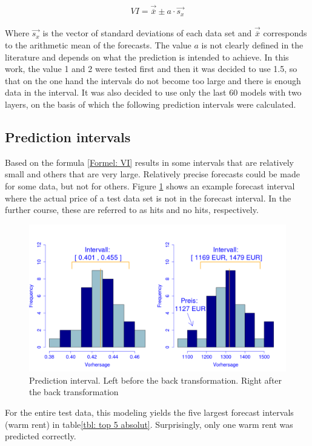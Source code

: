 \begin{align}\label{Formel: VI}
	VI=\vec{\overline{x}} \pm a \cdot \vec{s_x}
\end{align} 

	Where $\vec{s_x}$ is the vector of standard deviations of each data set and $\vec{\overline{x}}$ corresponds to the arithmetic mean of the forecasts. The value $a$ is not clearly defined in the literature and depends on what the prediction is intended to achieve. In this work, the value 1 and 2 were tested first and then it was decided to use 1.5, so that on the one hand the intervals do not become too large and there is enough data in the interval. It was also decided to use only the last 60 models with two layers, on the basis of which the following prediction intervals were calculated.

\subsection{Prediction intervals}

	Based on the formula \ref{Formel: VI} results in some intervals that are relatively small and others that are very large. Relatively precise forecasts could be made for some data, but not for others. Figure \ref{fig: HIST VI} shows an example forecast interval where the actual price of a test data set is not in the forecast interval. In the further course, these are referred to as hits and no hits, respectively.


\begin{figure}[h!]
	\centering
	\includegraphics[width=.9\linewidth]{img/hist KI}
	\caption{Prediction interval. Left before the back transformation. Right after the back transformation}
	\label{fig: HIST VI}
\end{figure}

		For the entire test data, this modeling yields the five largest forecast intervals (warm rent) in table\ref{tbl: top 5 absolut}. Surprisingly, only one warm rent was predicted correctly. 

